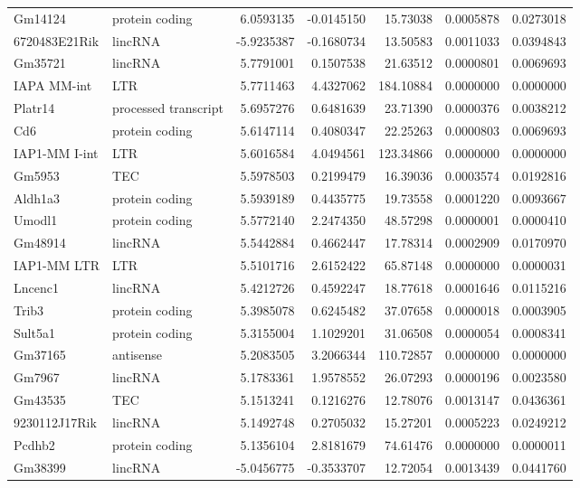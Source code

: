\documentclass[onehalf,12pt]{beavtex}
\begin{document}
\begin{longtable}{llrrrrr}
  Gm14124 & protein coding & 6.0593135 & -0.0145150 & 15.73038 & 0.0005878 & 0.0273018\\
  6720483E21Rik & lincRNA & -5.9235387 & -0.1680734 & 13.50583 & 0.0011033 & 0.0394843\\
  \addlinespace
  Gm35721 & lincRNA & 5.7791001 & 0.1507538 & 21.63512 & 0.0000801 & 0.0069693\\
  IAPA MM-int & LTR & 5.7711463 & 4.4327062 & 184.10884 & 0.0000000 & 0.0000000\\
  Platr14 & processed transcript & 5.6957276 & 0.6481639 & 23.71390 & 0.0000376 & 0.0038212\\
  Cd6 & protein coding & 5.6147114 & 0.4080347 & 22.25263 & 0.0000803 & 0.0069693\\
  IAP1-MM I-int & LTR & 5.6016584 & 4.0494561 & 123.34866 & 0.0000000 & 0.0000000\\
  \addlinespace
  Gm5953 & TEC & 5.5978503 & 0.2199479 & 16.39036 & 0.0003574 & 0.0192816\\
  Aldh1a3 & protein coding & 5.5939189 & 0.4435775 & 19.73558 & 0.0001220 & 0.0093667\\
  Umodl1 & protein coding & 5.5772140 & 2.2474350 & 48.57298 & 0.0000001 & 0.0000410\\
  Gm48914 & lincRNA & 5.5442884 & 0.4662447 & 17.78314 & 0.0002909 & 0.0170970\\
  IAP1-MM LTR & LTR & 5.5101716 & 2.6152422 & 65.87148 & 0.0000000 & 0.0000031\\
  \addlinespace
  Lncenc1 & lincRNA & 5.4212726 & 0.4592247 & 18.77618 & 0.0001646 & 0.0115216\\
  Trib3 & protein coding & 5.3985078 & 0.6245482 & 37.07658 & 0.0000018 & 0.0003905\\
  Sult5a1 & protein coding & 5.3155004 & 1.1029201 & 31.06508 & 0.0000054 & 0.0008341\\
  Gm37165 & antisense & 5.2083505 & 3.2066344 & 110.72857 & 0.0000000 & 0.0000000\\
  Gm7967 & lincRNA & 5.1783361 & 1.9578552 & 26.07293 & 0.0000196 & 0.0023580\\
  \addlinespace
  Gm43535 & TEC & 5.1513241 & 0.1216276 & 12.78076 & 0.0013147 & 0.0436361\\
  9230112J17Rik & lincRNA & 5.1492748 & 0.2705032 & 15.27201 & 0.0005223 & 0.0249212\\
  Pcdhb2 & protein coding & 5.1356104 & 2.8181679 & 74.61476 & 0.0000000 & 0.0000011\\
  Gm38399 & lincRNA & -5.0456775 & -0.3533707 & 12.72054 & 0.0013439 & 0.0441760\\

\end{longtable}
\end{document}
